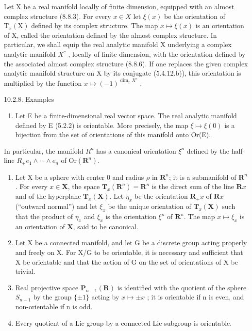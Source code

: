 Let X be a real manifold locally of finite dimension, equipped with an almost complex structure (8.8.3). For every \(x \in X\) let \(\xi(x)\) be the orientation of \(\mathrm{T}_{x}(\mathrm{X})\) defined by its complex structure. The map \(x \mapsto \xi(x)\) is an orientation of X, called the orientation defined by the almost complex structure. In particular, we shall equip the real analytic manifold X underlying a complex analytic manifold \(X^{c}\) , locally of finite dimension, with the orientation defined by the associated almost complex structure (8.8.6). If one replaces the given complex analytic manifold structure on X by its conjugate (5.4.12.b)), this orientation is multiplied by the function \(x \mapsto (-1)^{\dim_{x} X^{c}}\) .

10.2.8. Examples

\begin{enumerate}
\def\labelenumi{\alph{enumi})}
\tightlist
\item
  Let E be a finite-dimensional real vector space. The real analytic manifold defined by E (5.2.2) is orientable. More precisely, the map \(\xi \mapsto \xi(0)\) is a bijection from the set of orientations of this manifold onto Or(E).
\end{enumerate}

In particular, the manifold \(R^{n}\) has a canonical orientation \(\xi^{n}\) defined by the half-line \(R_{+}e_{1}\wedge\cdots\wedge e_{n}\) of \(\mathrm{Or}(\mathbf{R}^{n})\).

\begin{enumerate}
\def\labelenumi{\alph{enumi})}
\setcounter{enumi}{1}
\item
  Let X be a sphere with center 0 and radius \(\rho\) in \(\mathbf{R}^n\); it is a submanifold of \(\mathbf{R}^n\). For every \(x \in \mathbf{X}\), the space \(\mathbf{T}_x(\mathbf{R}^n) = \mathbf{R}^n\) is the direct sum of the line \(\mathbf{R}x\) and of the hyperplane \(\mathbf{T}_x(\mathbf{X})\). Let \(\eta_x\) be the orientation \(\mathbf{R}_+x\) of \(\mathbf{R}x\) (“outward normal”) and let \(\xi_x\) be the unique orientation of \(\mathbf{T}_x(\mathbf{X})\) such that the product of \(\eta_x\) and \(\xi_x\) is the orientation \(\xi^n\) of \(\mathbf{R}^n\). The map \(x \mapsto \xi_x\) is an orientation of \(\mathbf{X}\), said to be canonical.
\item
  Let X be a connected manifold, and let G be a discrete group acting properly and freely on X. For X/G to be orientable, it is necessary and sufficient that X be orientable and that the action of G on the set of orientations of X be trivial.
\item
  Real projective space \(\mathbf{P}_{n-1}(\mathbf{R})\) is identified with the quotient of the sphere \(S_{n-1}\) by the group \(\{\pm1\}\) acting by \(x\mapsto\pm x\) ; it is orientable if n is even, and non-orientable if n is odd.
\item
  Every quotient of a Lie group by a connected Lie subgroup is orientable.
\end{enumerate}

